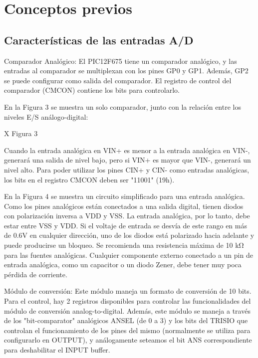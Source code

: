 \documentclass[a4paper]{article}
\begin{document}
\section{Conceptos previos}
\begin{Conceptos}
	\subsection{Características de las entradas A/D}\label{ej:monitoreo}
	{Comparador Analógico:}\label{ej:monitoreo}
	El PIC12F675 tiene un comparador analógico, y las entradas al
	comparador se multiplexan con los pines GP0 y GP1.
	Además, GP2 se puede configurar como salida del comparador.
	El registro de control del comparador (CMCON) contiene
	los bits para controlarlo.
	
	En la Figura 3 se muestra un solo comparador, junto con
	la relación entre los niveles E/S análogo-digital:
	
	X
	Figura 3
	
	Cuando la entrada analógica en VIN+ es menor a la entrada
	analógica en VIN-, generará una salida de nivel bajo, pero si VIN+
	es mayor que VIN-, generará un nivel alto.
	Para poder utilizar los pines CIN+ y CIN- como entradas analógicas,
	los bits en el registro CMCON deben ser "11001" (19h).
	
	En la Figura 4 se muestra un circuito simplificado para una
	entrada analógica. Como los pines analógicos están conectados
	a una salida digital, tienen diodos con polarización inversa a VDD y VSS.
	La entrada analógica, por lo tanto, debe estar entre VSS y VDD.
	Si el voltaje de entrada se desvía de este rango en más de 0.6V
	en cualquier dirección, uno de los diodos está polarizado hacia adelante
	y puede producirse un bloqueo.
	Se recomienda una resistencia máxima de 10 kΩ para las fuentes analógicas.
	Cualquier componente externo conectado a un pin de entrada analógica,
	como un capacitor o un diodo Zener, debe tener muy poca pérdida de corriente.
	
	{Módulo de conversión:}\label{ej:monitoreo}
	Este módulo maneja un formato de conversión de 10 bits. Para el control,
	hay 2 registros disponibles para controlar las funcionalidades
	del módulo de conversión analog-to-digital.
	Además, este módulo se maneja a través de los "bit-comparator" analógicos
	ANSEL (de 0 a 3) y los bits del TRISIO que controlan el funcionamiento
	de los pines del mismo (normalmente se utiliza para configurarlo en OUTPUT),
	y análogamente seteamos el bit ANS correspondiente para deshabilitar el INPUT buffer.
	

\end{Conceptos}
\end{document}
